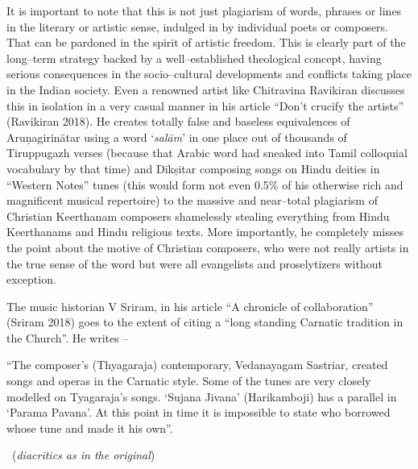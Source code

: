 It is important to note that this is not just plagiarism of words, phrases or lines in the literary or artistic sense, indulged in by individual poets or composers. That can be pardoned in the spirit of artistic freedom. This is clearly part of the long–term strategy backed by a well–established theological concept, having serious consequences in the socio–cultural developments and conflicts taking place in the Indian society. Even a renowned artist like Chitravina Ravikiran discusses this in isolation in a very casual manner in his article “Don’t crucify the artists” (Ravikiran 2018). He creates totally false and baseless equivalences of Aruṇagirinātar using a word ‘\textit{salām}’ in one place out of thousands of Tiruppugazh verses (because that Arabic word had sneaked into Tamil colloquial vocabulary by that time) and Dīkṣitar composing songs on Hindu deities in “Western Notes” tunes (this would form not even 0.5\% of his otherwise rich and magnificent musical repertoire) to the massive and near–total plagiarism of Christian Keerthanam composers shamelessly stealing everything from Hindu Keerthanams and Hindu religious texts. More importantly, he completely misses the point about the motive of Christian composers, who were not really artists in the true sense of the word but were all evangelists and proselytizers without exception.

The music historian V Sriram, in his article “A chronicle of collaboration” (Sriram 2018) goes to the extent of citing a “long standing Carnatic tradition in the Church”. He writes –

\begin{myquote}
“The composer’s (Thyagaraja) contemporary, Vedanayagam Sastriar, created songs and operas in the Carnatic style. Some of the tunes are very closely modelled on Tyagaraja’s songs. ‘Sujana Jivana’ (Harikamboji) has a parallel in ‘Parama Pavana’. At this point in time it is impossible to state who borrowed whose tune and made it his own”. 

~\hfill (\textit{diacritics as in the original})
\end{myquote}

